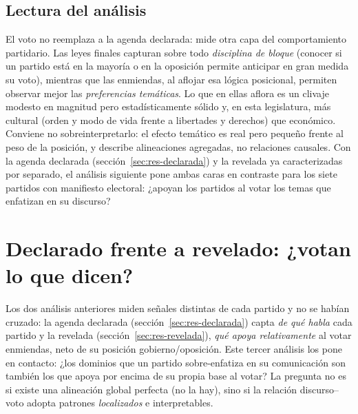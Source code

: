 \subsection{Lectura del análisis}
\label{sec:res-revelada-cierre}

El voto no reemplaza a la agenda declarada: mide otra capa del comportamiento
partidario. Las leyes finales capturan sobre todo \emph{disciplina de bloque}
(conocer si un partido está en la mayoría o en la oposición permite anticipar
en gran medida su voto), mientras que las enmiendas, al aflojar esa lógica
posicional, permiten observar mejor las \emph{preferencias temáticas}. Lo que en
ellas aflora es un clivaje modesto en magnitud pero estadísticamente sólido y,
en esta legislatura, más cultural (orden y modo de vida frente a libertades y
derechos) que económico. Conviene no sobreinterpretarlo: el efecto temático es
real pero pequeño frente al peso de la posición, y describe alineaciones
agregadas, no relaciones causales. Con la agenda declarada
(sección~\ref{sec:res-declarada}) y la revelada ya caracterizadas por separado,
el análisis siguiente pone ambas caras en contraste para los siete partidos con
manifiesto electoral: ¿apoyan los partidos al votar los temas que enfatizan en su
discurso?

\section{Declarado frente a revelado: ¿votan lo que dicen?}
\label{sec:res-declarado-revelado}

Los dos análisis anteriores miden señales distintas de cada partido y no se
habían cruzado: la agenda declarada (sección~\ref{sec:res-declarada}) capta
\emph{de qué habla} cada partido y la revelada
(sección~\ref{sec:res-revelada}), \emph{qué apoya relativamente} al votar
enmiendas, neto de su posición gobierno/oposición. Este tercer análisis los pone
en contacto: ¿los dominios que un partido sobre-enfatiza en su comunicación son
también los que apoya por encima de su propia base al votar? La pregunta no es si
existe una alineación global perfecta (no la hay), sino si la relación
discurso--voto adopta patrones \emph{localizados} e interpretables.

